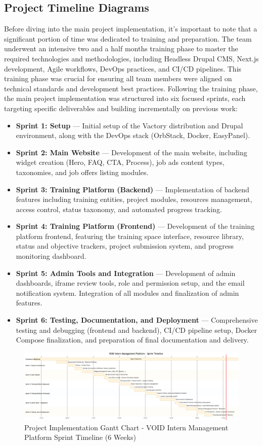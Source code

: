 \subsection{Project Timeline Diagrams}

\noindent
Before diving into the main project implementation, it's important to note that a significant portion of time was dedicated to training and preparation. The team underwent an intensive two and a half months training phase to master the required technologies and methodologies, including Headless Drupal CMS, Next.js development, Agile workflows, DevOps practices, and CI/CD pipelines. This training phase was crucial for ensuring all team members were aligned on technical standards and development best practices.
\noindent
Following the training phase, the main project implementation was structured into six focused sprints, each targeting specific deliverables and building incrementally on previous work:

\begin{itemize}
    \item \textbf{Sprint 1: Setup} — Initial setup of the Vactory distribution and Drupal environment, along with the DevOps stack (OrbStack, Docker, EasyPanel).
    \item \textbf{Sprint 2: Main Website} — Development of the main website, including widget creation (Hero, FAQ, CTA, Process), job ads content types, taxonomies, and job offers listing modules.
    \item \textbf{Sprint 3: Training Platform (Backend)} — Implementation of backend features including training entities, project modules, resources management, access control, status taxonomy, and automated progress tracking.
    \item \textbf{Sprint 4: Training Platform (Frontend)} — Development of the training platform frontend, featuring the training space interface, resource library, status and objective trackers, project submission system, and progress monitoring dashboard.
    \item \textbf{Sprint 5: Admin Tools and Integration} — Development of admin dashboards, iframe review tools, role and permission setup, and the email notification system. Integration of all modules and finalization of admin features.
    \item \textbf{Sprint 6: Testing, Documentation, and Deployment} — Comprehensive testing and debugging (frontend and backend), CI/CD pipeline setup, Docker Compose finalization, and preparation of final documentation and delivery.
\end{itemize}

\begin{figure}[H]
    \centering
    \includegraphics[angle=90,width=\textwidth,height=\textheight,keepaspectratio]{images/gant-wwi.png}
    \caption{Project Implementation Gantt Chart - VOID Intern Management Platform Sprint Timeline (6 Weeks)}
    \label{fig:gantt_project}
\end{figure}
